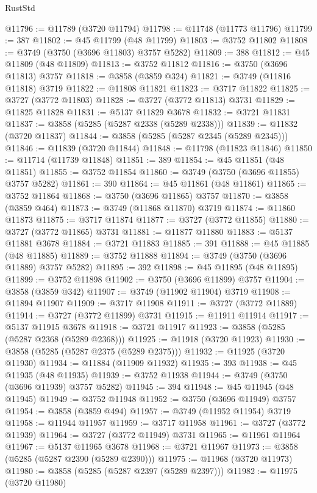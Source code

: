 \begin{lexlean}{RustStd}
\begin{coremodule}
@11796 := @11789 (@3720 @11794)
@11798 := @11748 (@11773 @11796)
@11799 := 387
@11802 := @45 @11799 (@48 @11799)
@11803 := @3752 @11802
@11808 := @3749 (@3750 (@3696 @11803) @3757 @5282)
@11809 := 388
@11812 := @45 @11809 (@48 @11809)
@11813 := @3752 @11812
@11816 := @3750 (@3696 @11813) @3757
@11818 := @3858 (@3859 @324)
@11821 := @3749 (@11816 @11818) @3719
@11822 := @11808 @11821
@11823 := @3717 @11822
@11825 := @3727 (@3772 @11803)
@11828 := @3727 (@3772 @11813) @3731
@11829 := @11825 @11828
@11831 := @5137 @11829 @3678
@11832 := @3721 @11831
@11837 := @3858 (@5285 (@5287 @2338 (@5289 @2338)))
@11839 := @11832 (@3720 @11837)
@11844 := @3858 (@5285 (@5287 @2345 (@5289 @2345)))
@11846 := @11839 (@3720 @11844)
@11848 := @11798 (@11823 @11846)
@11850 := @11714 (@11739 @11848)
@11851 := 389
@11854 := @45 @11851 (@48 @11851)
@11855 := @3752 @11854
@11860 := @3749 (@3750 (@3696 @11855) @3757 @5282)
@11861 := 390
@11864 := @45 @11861 (@48 @11861)
@11865 := @3752 @11864
@11868 := @3750 (@3696 @11865) @3757
@11870 := @3858 (@3859 @464)
@11873 := @3749 (@11868 @11870) @3719
@11874 := @11860 @11873
@11875 := @3717 @11874
@11877 := @3727 (@3772 @11855)
@11880 := @3727 (@3772 @11865) @3731
@11881 := @11877 @11880
@11883 := @5137 @11881 @3678
@11884 := @3721 @11883
@11885 := 391
@11888 := @45 @11885 (@48 @11885)
@11889 := @3752 @11888
@11894 := @3749 (@3750 (@3696 @11889) @3757 @5282)
@11895 := 392
@11898 := @45 @11895 (@48 @11895)
@11899 := @3752 @11898
@11902 := @3750 (@3696 @11899) @3757
@11904 := @3858 (@3859 @342)
@11907 := @3749 (@11902 @11904) @3719
@11908 := @11894 @11907
@11909 := @3717 @11908
@11911 := @3727 (@3772 @11889)
@11914 := @3727 (@3772 @11899) @3731
@11915 := @11911 @11914
@11917 := @5137 @11915 @3678
@11918 := @3721 @11917
@11923 := @3858 (@5285 (@5287 @2368 (@5289 @2368)))
@11925 := @11918 (@3720 @11923)
@11930 := @3858 (@5285 (@5287 @2375 (@5289 @2375)))
@11932 := @11925 (@3720 @11930)
@11934 := @11884 (@11909 @11932)
@11935 := 393
@11938 := @45 @11935 (@48 @11935)
@11939 := @3752 @11938
@11944 := @3749 (@3750 (@3696 @11939) @3757 @5282)
@11945 := 394
@11948 := @45 @11945 (@48 @11945)
@11949 := @3752 @11948
@11952 := @3750 (@3696 @11949) @3757
@11954 := @3858 (@3859 @494)
@11957 := @3749 (@11952 @11954) @3719
@11958 := @11944 @11957
@11959 := @3717 @11958
@11961 := @3727 (@3772 @11939)
@11964 := @3727 (@3772 @11949) @3731
@11965 := @11961 @11964
@11967 := @5137 @11965 @3678
@11968 := @3721 @11967
@11973 := @3858 (@5285 (@5287 @2390 (@5289 @2390)))
@11975 := @11968 (@3720 @11973)
@11980 := @3858 (@5285 (@5287 @2397 (@5289 @2397)))
@11982 := @11975 (@3720 @11980)

\end{coremodule}
\end{lexlean}
